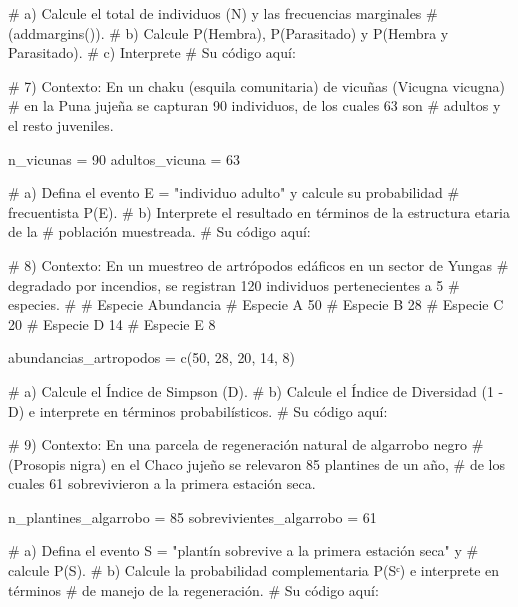 \documentclass[
  spanish,
  letterpaper,
  DIV=11,
  numbers=noendperiod]{scrreprt}
\newenvironment{Shaded}{\begin{snugshade}}{\end{snugshade}}
\newcommand{\CommentTok}[1]{\textcolor[rgb]{0.37,0.37,0.37}{#1}}
\newcommand{\DecValTok}[1]{\textcolor[rgb]{0.68,0.00,0.00}{#1}}
\newcommand{\FunctionTok}[1]{\textcolor[rgb]{0.28,0.35,0.67}{#1}}
\newcommand{\NormalTok}[1]{\textcolor[rgb]{0.00,0.23,0.31}{#1}}
\newcommand{\OtherTok}[1]{\textcolor[rgb]{0.00,0.23,0.31}{#1}}
\begin{document}
\begin{Shaded}
\begin{Highlighting}[]
\CommentTok{\#    a) Calcule el total de individuos (N) y las frecuencias marginales}
\CommentTok{\#       (addmargins()).}
\CommentTok{\#    b) Calcule P(Hembra), P(Parasitado) y P(Hembra y Parasitado).}
\CommentTok{\#    c) Interprete}
\CommentTok{\# Su código aquí:}


\CommentTok{\# 7) Contexto: En un chaku (esquila comunitaria) de vicuñas (Vicugna vicugna)}
\CommentTok{\#    en la Puna jujeña se capturan 90 individuos, de los cuales 63 son}
\CommentTok{\#    adultos y el resto juveniles.}

\NormalTok{n\_vicunas }\OtherTok{=} \DecValTok{90}
\NormalTok{adultos\_vicuna }\OtherTok{=} \DecValTok{63}

\CommentTok{\#    a) Defina el evento E = "individuo adulto" y calcule su probabilidad}
\CommentTok{\#       frecuentista P(E).}
\CommentTok{\#    b) Interprete el resultado en términos de la estructura etaria de la}
\CommentTok{\#       población muestreada.}
\CommentTok{\# Su código aquí:}


\CommentTok{\# 8) Contexto: En un muestreo de artrópodos edáficos en un sector de Yungas}
\CommentTok{\#    degradado por incendios, se registran 120 individuos pertenecientes a 5}
\CommentTok{\#    especies.}
\CommentTok{\#}
\CommentTok{\#    Especie       Abundancia}
\CommentTok{\#    Especie A          50}
\CommentTok{\#    Especie B          28}
\CommentTok{\#    Especie C          20}
\CommentTok{\#    Especie D          14}
\CommentTok{\#    Especie E           8}

\NormalTok{abundancias\_artropodos }\OtherTok{=} \FunctionTok{c}\NormalTok{(}\DecValTok{50}\NormalTok{, }\DecValTok{28}\NormalTok{, }\DecValTok{20}\NormalTok{, }\DecValTok{14}\NormalTok{, }\DecValTok{8}\NormalTok{)}

\CommentTok{\#    a) Calcule el Índice de Simpson (D).}
\CommentTok{\#    b) Calcule el Índice de Diversidad (1 {-} D) e interprete en términos probabilísticos.}
\CommentTok{\# Su código aquí:}


\CommentTok{\# 9) Contexto: En una parcela de regeneración natural de algarrobo negro}
\CommentTok{\#    (Prosopis nigra) en el Chaco jujeño se relevaron 85 plantines de un año,}
\CommentTok{\#    de los cuales 61 sobrevivieron a la primera estación seca.}

\NormalTok{n\_plantines\_algarrobo }\OtherTok{=} \DecValTok{85}
\NormalTok{sobrevivientes\_algarrobo }\OtherTok{=} \DecValTok{61}

\CommentTok{\#    a) Defina el evento S = "plantín sobrevive a la primera estación seca" y}
\CommentTok{\#       calcule P(S).}
\CommentTok{\#    b) Calcule la probabilidad complementaria P(Sᶜ) e interprete en términos}
\CommentTok{\#       de manejo de la regeneración.}
\CommentTok{\# Su código aquí:}



\end{Highlighting}
\end{Shaded}
\end{document}
